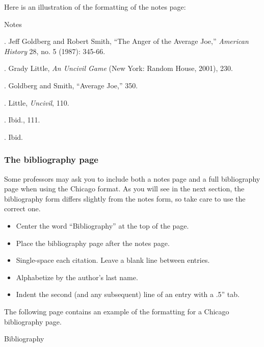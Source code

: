 Here is an illustration of the formatting of the notes page:
\newpage

\thispagestyle{empty}
\begin{center}Notes\end{center}
\smallskip

. Jeff Goldberg and Robert Smith, ``The Anger of the Average Joe,'' \emph{American History} 28, no. 5 (1987): 345-66.
\smallskip

. Grady Little, \emph{An Uncivil Game} (New York: Random House, 2001), 230.
\smallskip

. Goldberg and Smith, ``Average Joe,'' 350.
\smallskip

. Little, \emph{Uncivil}, 110.
\smallskip

. Ibid., 111.
\smallskip

. Ibid.

\newpage





\subsubsection{The bibliography page}
Some professors may ask you to include both a notes page and a full bibliography page when using the Chicago format. As you will see in the next section, the bibliography form differs slightly from the notes form, so take care to use the correct one.

\begin{itemize}
\item Center the word ``Bibliography'' at the top of the page.
\item Place the bibliography page after the notes page.
\item Single-space each citation. Leave a blank line between entries.
\item Alphabetize by the author's last name.
\item Indent the second (and any subsequent) line of an entry with a .5'' tab.
\end{itemize}

The following page contains an example of the formatting for a Chicago bibliography page.
\newpage





\thispagestyle{empty}
\begin{center}Bibliography\end{center}

